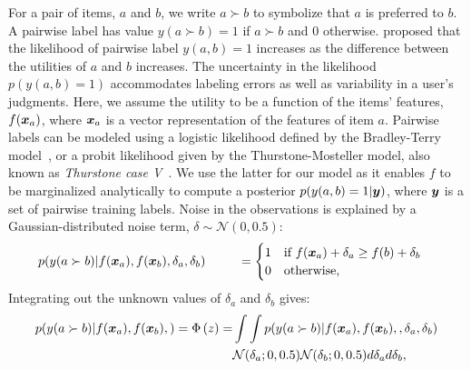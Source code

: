 For a pair of items, $a$ and $b$, we write $a \succ b$ to symbolize that $a$ is preferred to $b$.  
A pairwise label has value $y(a \succ b) =1 $ if $a \succ b$ and $0$ otherwise.
\citet{thurstone1927law} proposed that the likelihood of pairwise label $y(a,b)=1$ 
increases as the difference between the utilities of $a$ and $b$ increases. 
The uncertainty in the likelihood $p(y(a,b)=1)$ accommodates
 labeling errors %
 as well as variability in a user's judgments.
Here, we assume the utility to be a function of the items' features,
$f(\boldsymbol x_a)$, where $\boldsymbol x_a$ is a vector representation of the features of item $a$.
Pairwise labels can be modeled using a logistic likelihood %
defined by the Bradley-Terry model~\citep{bradley1952rank,plackett1975analysis,luce1959possible},
or a probit likelihood given by the Thurstone-Mosteller model, also known as \emph{Thurstone case V}~\citep{thurstone1927law,mosteller2006remarks}.
We use the latter for our model as it enables $f$ to be marginalized analytically to compute a posterior $p(y(a,b)=1 | \boldsymbol y)$,
where $\boldsymbol y$ is a set of pairwise training labels.
Noise in the observations is explained by a Gaussian-distributed noise term, $\delta \sim \mathcal{N}(0, 0.5)$:
\begin{align}
 p(y(a \succ b) | f(\boldsymbol x_a), f(\boldsymbol x_b), \delta_{a}, \delta_{b} )  
 \hspace{0.9cm} & = \begin{cases}
 1 & \text{if }f(\boldsymbol x_a) + \delta_{a} \geq f(b) + \delta_{b} \\
 0 & \text{otherwise,}
 \end{cases} &
 \label{eq:thurstone}
\end{align}
Integrating out the unknown values of $\delta_a$ and $\delta_b$ gives:
\begin{align}
p( y(a \succ b) | f(\boldsymbol x_a), f(\boldsymbol x_b),  ) 
= \Phi\left( z \right) = & \int\int p( y(a \succ b) | f(\boldsymbol x_a), f(\boldsymbol x_b), , \delta_{a}, \delta_{b} ) \nonumber\\
& \mathcal{N}(\delta_{a}; 0, 0.5)\mathcal{N}(\delta_{b}; 0, 0.5) d\delta_{a} d\delta_{b}, 
\label{eq:plphi}
\end{align}
